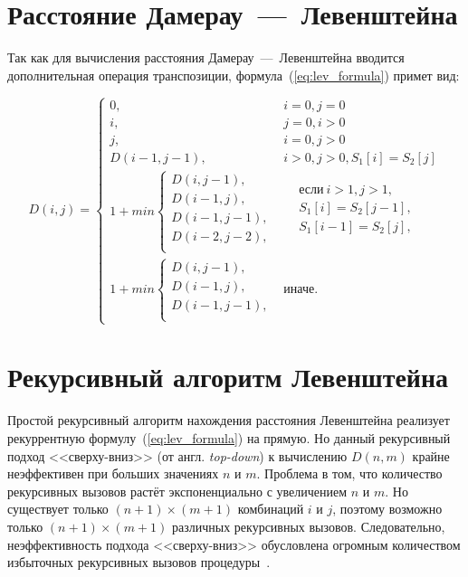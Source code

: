\section{Расстояние Дамерау~---~Левенштейна}

Так как для вычисления расстояния Дамерау~---~Левенштейна вводится дополнительная операция транспозиции, формула~(\ref{eq:lev_formula}) примет вид:

\begin{equation}
\label{eqn:dam_lev_formula}
	D(i, j) = 
	\begin{cases}
		0, & i = 0, j = 0\\
            i, & j = 0, i > 0\\
            j, & i = 0, j > 0\\
            D(i-1, j-1), & i > 0, j > 0, S_1[i] = S_2[j]\\
		1 + min \begin{cases}
			D(i, j - 1),\\
			D(i - 1, j),\\
			D(i - 1, j - 1), \\
			D(i - 2, j - 2), \\
		\end{cases}
		& \begin{aligned}
			& \text{если} \ i > 1, j > 1, \\
			& S_{1}[i] = S_{2}[j - 1], \\
			& S_{1}[i - 1] = S_{2}[j], \\
		\end{aligned}\\
		1 + min \begin{cases}
			D(i, j - 1),\\
			D(i - 1, j), \\
			D(i - 1, j - 1), \\
		\end{cases}
		 & \text{иначе.}
	\end{cases}
\end{equation}

\section{Рекурсивный алгоритм Левенштейна}

Простой рекурсивный алгоритм нахождения расстояния Левенштейна реализует рекуррентную формулу~(\ref{eq:lev_formula}) на прямую. Но данный рекурсивный подход <<сверху-вниз>> (от англ. \textit{top-down}) к вычислению \(D(n, m)\) крайне неэффективен при больших значениях \(n\) и \(m\). Проблема в том, что количество рекурсивных вызовов растёт экспоненциально с увеличением \(n\) и \(m\). Но существует только \((n + 1) \times (m + 1)\) комбинаций \(i\) и \(j\), поэтому возможно только \((n + 1) \times (m + 1)\) различных рекурсивных вызовов. Следовательно, неэффективность подхода <<сверху-вниз>> обусловлена огромным количеством избыточных рекурсивных вызовов процедуры~\cite{cambridge}.

